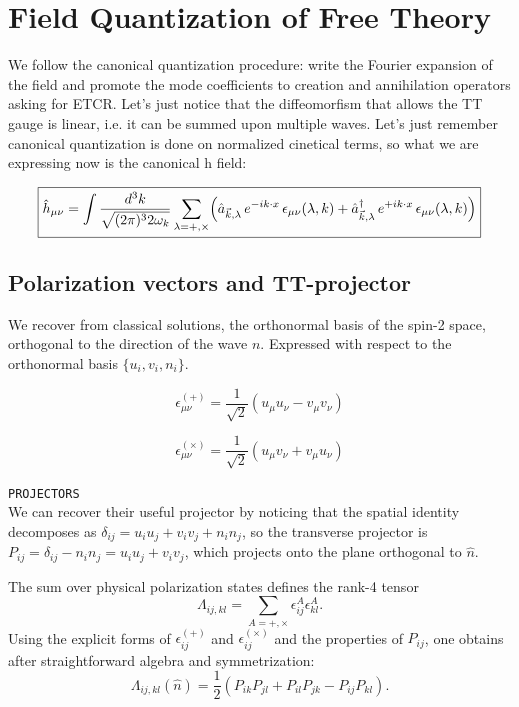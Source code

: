 \documentclass[12pt,a4paper]{article}
\begin{document}
\section{Field Quantization of Free Theory}


We follow the canonical quantization procedure: write the Fourier expansion of the field and promote the mode coefficients to creation and annihilation operators asking for ETCR. Let's just notice that the diffeomorfism that allows the TT gauge is linear, i.e. it can be summed upon multiple waves. Let's just remember canonical quantization is done on normalized cinetical terms, so what we are expressing now is the canonical h field:

\begin{equation}
\boxed{
    \hat{h}_{\mu\nu} = \int \frac{d^3k}{\sqrt{(2\pi)^3 2\omega_k}}
    \sum_{\lambda=+,\times}
    \Bigl(
        \hat{a}_{\vec{k},\lambda}\, e^{-ik\cdot x}\, \epsilon_{\mu\nu}(\lambda,k)
        +
        \hat{a}^{\dagger}_{\vec{k},\lambda}\, e^{+ik\cdot x}\, \epsilon_{\mu\nu}(\lambda,k)
    \Bigr)
}
\end{equation}

\subsection*{Polarization vectors and TT-projector}
We recover from classical solutions, the orthonormal basis of the spin-2 space, orthogonal to the direction of the wave $n$. Expressed with respect to the orthonormal basis $\{u_i, v_i, n_i\}$.

\[
\epsilon^{(+)}_{\mu\nu} = \frac{1}{\sqrt{2}}
\left( u_\mu u_\nu - v_\mu v_\nu \right)
\]

\[
\epsilon^{(\times)}_{\mu\nu} = \frac{1}{\sqrt{2}}
\left( u_\mu v_\nu + v_\mu u_\nu \right)
\]

\texttt{PROJECTORS}\\
We can recover their useful projector by noticing that the spatial identity decomposes as $
\delta_{ij} = u_i u_j + v_i v_j + n_i n_j $, so the transverse projector is 
$P_{ij} = \delta_{ij} - n_i n_j = u_i u_j + v_i v_j$,
which projects onto the plane orthogonal to $\hat{n}$.

The sum over physical polarization states defines the rank-4 tensor
\[
\Lambda_{ij,kl} = \sum_{A=+,\times} \epsilon^A_{ij}\epsilon^A_{kl}.
\]
Using the explicit forms of $\epsilon^{(+)}_{ij}$ and $\epsilon^{(\times)}_{ij}$ and the properties of $P_{ij}$, one obtains after straightforward algebra and symmetrization:
\[
\boxed{
\Lambda_{ij,kl}(\hat{n}) = \frac{1}{2}\left(P_{ik}P_{jl} + P_{il}P_{jk} - P_{ij}P_{kl}\right).
}
\]
\end{document}
